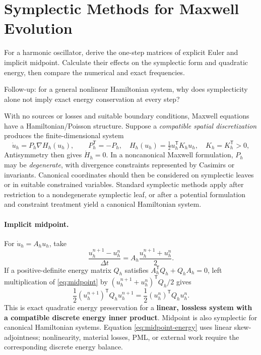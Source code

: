 \documentclass[11pt,openany]{book}
\numberwithin{equation}{chapter}
\theoremstyle{definition}
\theoremstyle{remark}
\begin{document}
\section{Symplectic Methods for Maxwell Evolution}\label{sec:bridge-symp}
\begin{askai}
For a harmonic oscillator, derive the one-step matrices of explicit Euler and implicit midpoint. Calculate their effects on the symplectic form and quadratic energy, then compare the numerical and exact frequencies.

Follow-up: for a general nonlinear Hamiltonian system, why does symplecticity alone not imply exact energy conservation at every step?
\end{askai}
With no sources or losses and suitable boundary conditions, Maxwell equations have a Hamiltonian/Poisson structure.
Suppose a \emph{compatible spatial discretization} produces the finite-dimensional system
\begin{equation}\label{eq:discrete-hamiltonian}
\dot u_h=P_h\nabla H_h(u_h),\qquad
P_h^\mathsf T=-P_h,\quad
H_h(u_h)=\tfrac12u_h^\mathsf TK_hu_h,
\quad K_h=K_h^\mathsf T>0,
\end{equation}
Antisymmetry then gives $\dot H_h=0$. In a noncanonical Maxwell formulation,
$P_h$ may be \emph{degenerate}, with divergence constraints represented by Casimirs or invariants.
Canonical coordinates should then be considered on symplectic leaves or in suitable constrained variables.
Standard symplectic methods apply after restriction to a nondegenerate symplectic leaf,
or after a potential formulation and constraint treatment yield a canonical Hamiltonian system.

\paragraph{Implicit midpoint.}
For $\dot u_h=A_hu_h$, take
\begin{equation}\label{eq:midpoint}
\frac{u_h^{n+1}-u_h^n}{\Delta t}
=A_h\frac{u_h^{n+1}+u_h^n}{2}.
\end{equation}
If a positive-definite energy matrix $Q_h$ satisfies
$A_h^\mathsf TQ_h+Q_hA_h=0$, left multiplication of
\eqref{eq:midpoint} by $(u_h^{n+1}+u_h^n)^\mathsf TQ_h/2$ gives
\begin{equation}\label{eq:midpoint-energy}
\frac12(u_h^{n+1})^\mathsf TQ_hu_h^{n+1}
=\frac12(u_h^n)^\mathsf TQ_hu_h^n.
\end{equation}
This is exact quadratic energy preservation for a \textbf{linear, lossless system with a compatible discrete energy inner product}.
Midpoint is also symplectic for canonical Hamiltonian systems.
Equation \eqref{eq:midpoint-energy} uses linear skew-adjointness; nonlinearity, material losses, PML, or external work require the corresponding discrete energy balance.
\end{document}
